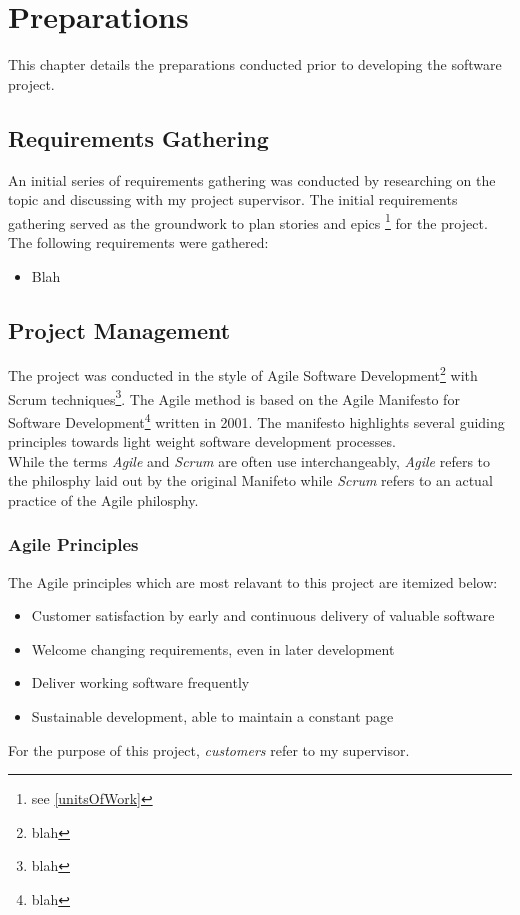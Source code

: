 \chapter{Preparations}

This chapter details the preparations conducted prior to developing the software project.

\section{Requirements Gathering}

An initial series of requirements gathering was conducted by researching on the topic and discussing with my project supervisor. The initial requirements gathering served as the groundwork to plan stories and epics \footnote{see \ref{unitsOfWork}} for the project. The following requirements were gathered:

\begin{itemize}
    \item Blah
\end{itemize}

\section{Project Management}

The project was conducted in the style of Agile Software Development\footnote{blah} with Scrum techniques\footnote{blah}. The Agile method is based on the Agile Manifesto for Software Development\footnote{blah} written in 2001. The manifesto highlights several guiding principles towards light weight software development processes.\\

While the terms \textit{Agile} and \textit{Scrum} are often use interchangeably, \textit{Agile} refers to the philosphy laid out by the original Manifeto while \textit{Scrum} refers to an actual practice of the Agile philosphy.

\subsection{Agile Principles}

The Agile principles which are most relavant to this project are itemized below:
\begin{itemize}
    \item Customer satisfaction by early and continuous delivery of valuable software
    \item Welcome changing requirements, even in later development
    \item Deliver working software frequently
    \item Sustainable development, able to maintain a constant page
\end{itemize}
For the purpose of this project, \textit{customers} refer to my supervisor.


